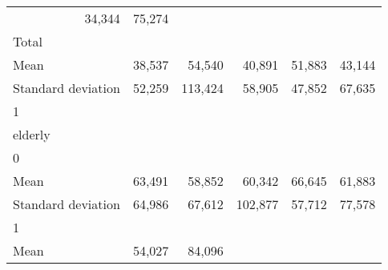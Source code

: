 \begin{tabular}{llllll}
  \multicolumn{1}{r}{34,344} &
  \multicolumn{1}{r}{75,274} \\
\multicolumn{1}{l}{\hspace{3em}Total} &
  \multicolumn{1}{|r}{} &
  \multicolumn{1}{r}{} &
  \multicolumn{1}{r}{} &
  \multicolumn{1}{r}{} &
  \multicolumn{1}{r}{} \\
\multicolumn{1}{l}{\hspace{4em}Mean} &
  \multicolumn{1}{|r}{38,537} &
  \multicolumn{1}{r}{54,540} &
  \multicolumn{1}{r}{40,891} &
  \multicolumn{1}{r}{51,883} &
  \multicolumn{1}{r}{43,144} \\
\multicolumn{1}{l}{\hspace{4em}Standard deviation} &
  \multicolumn{1}{|r}{52,259} &
  \multicolumn{1}{r}{113,424} &
  \multicolumn{1}{r}{58,905} &
  \multicolumn{1}{r}{47,852} &
  \multicolumn{1}{r}{67,635} \\
\multicolumn{1}{l}{\hspace{1em}1} &
  \multicolumn{1}{|r}{} &
  \multicolumn{1}{r}{} &
  \multicolumn{1}{r}{} &
  \multicolumn{1}{r}{} &
  \multicolumn{1}{r}{} \\
\multicolumn{1}{l}{\hspace{2em}elderly} &
  \multicolumn{1}{|r}{} &
  \multicolumn{1}{r}{} &
  \multicolumn{1}{r}{} &
  \multicolumn{1}{r}{} &
  \multicolumn{1}{r}{} \\
\multicolumn{1}{l}{\hspace{3em}0} &
  \multicolumn{1}{|r}{} &
  \multicolumn{1}{r}{} &
  \multicolumn{1}{r}{} &
  \multicolumn{1}{r}{} &
  \multicolumn{1}{r}{} \\
\multicolumn{1}{l}{\hspace{4em}Mean} &
  \multicolumn{1}{|r}{63,491} &
  \multicolumn{1}{r}{58,852} &
  \multicolumn{1}{r}{60,342} &
  \multicolumn{1}{r}{66,645} &
  \multicolumn{1}{r}{61,883} \\
\multicolumn{1}{l}{\hspace{4em}Standard deviation} &
  \multicolumn{1}{|r}{64,986} &
  \multicolumn{1}{r}{67,612} &
  \multicolumn{1}{r}{102,877} &
  \multicolumn{1}{r}{57,712} &
  \multicolumn{1}{r}{77,578} \\
\multicolumn{1}{l}{\hspace{3em}1} &
  \multicolumn{1}{|r}{} &
  \multicolumn{1}{r}{} &
  \multicolumn{1}{r}{} &
  \multicolumn{1}{r}{} &
  \multicolumn{1}{r}{} \\
\multicolumn{1}{l}{\hspace{4em}Mean} &
  \multicolumn{1}{|r}{54,027} &
  \multicolumn{1}{r}{84,096} &

\end{tabular}
